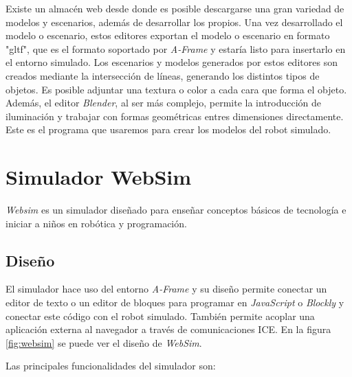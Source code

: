 Existe un almacén web desde donde es posible descargarse una gran variedad de modelos y escenarios, además de desarrollar los propios. Una vez desarrollado el modelo o escenario, estos editores exportan el modelo o escenario en formato "gltf", que es el formato soportado por \textit{A-Frame} y estaría listo para insertarlo en el entorno simulado.\newline
Los escenarios y modelos generados por estos editores son creados mediante la intersección de líneas, generando los distintos tipos de objetos. Es posible adjuntar una textura o color a cada cara que forma el objeto. Además, el editor \textit{Blender}, al ser más complejo, permite la introducción de iluminación y trabajar con formas geométricas entres dimensiones directamente.\newline
Este es el programa que usaremos para crear los modelos del robot simulado.


\section{Simulador WebSim}

\textit{Websim} es un simulador diseñado para enseñar conceptos básicos de tecnología e iniciar a niños en robótica y programación. 
\subsection{Diseño}
\label{subsec:design}
El simulador hace uso del entorno \textit{A-Frame} y su diseño permite conectar un editor de texto o un editor de bloques para  programar en \textit{JavaScript} o \textit{Blockly} y conectar este código con el robot simulado. También permite acoplar una aplicación externa al navegador a través de comunicaciones ICE. En la figura \ref{fig:websim} se puede ver el diseño de \textit{WebSim}.

Las principales funcionalidades del simulador son: 

